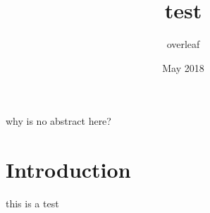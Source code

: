 \documentclass{article}
\title{test}
\author{overleaf }
\date{May 2018}
\begin{document}
\maketitle
why is no abstract here?
\section{Introduction}
this is a test
\end{document}
